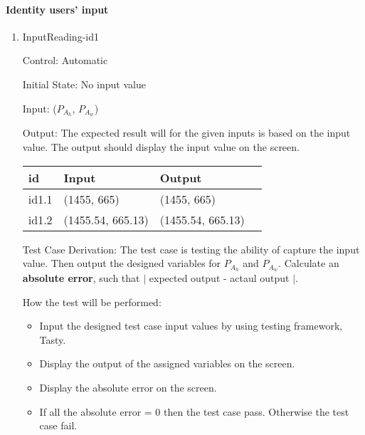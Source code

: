 \documentclass[12pt, titlepage]{article}
\begin{document}
\paragraph{Identity users' input}
\begin{enumerate}

\item{InputReading-id1\\}

Control: Automatic
					
Initial State: No input value
					
Input: ($P_{A_{h}}$, $P_{A_{w}}$)


Output: The expected result will for the given inputs is based on the input value.
The output should display the input value on the screen.


\noindent \begin{tabular}{l l l l} 
    \toprule		
    \textbf{id} & \textbf{Input} & \textbf{Output}\\ 
	\midrule
   id1.1 &  (1455, 665)  & (1455, 665)\\
   id1.2 &  (1455.54, 665.13) & (1455.54, 665.13)\\
    \bottomrule
  \end{tabular}


Test Case Derivation: The test case is testing the ability of capture the input value. Then output the designed variables for  $P_{A_{h}}$ and $P_{A_{w}}$. Calculate an \textbf{absolute error}, such that $|$ expected output - actaul output $|$.

How the test will be performed:

\begin{itemize} 
\item Input the designed test case input values by using testing framework, Tasty. 
\item Display the output of the assigned variables on the screen.
\item  Display the absolute error on the screen.
\item  If all the absolute error = 0 then the test case pass. Otherwise the test case fail.
\end{itemize}

 
  

\end{enumerate}
\end{document}
